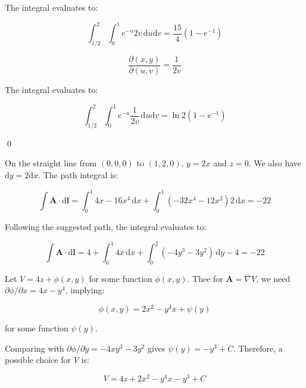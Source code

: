 \documentclass[12pt]{article}
\begin{document}
The integral evaluates to:

\begin{equation}
    \int_{1/2}^{2} \int_{0}^{1} e^{-u} 2v \, \mathrm{d}u \mathrm{d}v = \frac{15}{4} (1 - e^{-1})
\end{equation}

\begin{correction}
    \begin{equation}
        \frac{\partial (x, y)}{\partial (u, v)} = \frac{1}{2v}
    \end{equation}

    The integral evaluates to:

    \begin{equation}
        \int_{1/2}^{2} \int_{0}^{1} e^{-u} \frac{1}{2v} \, \mathrm{d}u \mathrm{d}v = \ln{2} (1 - e^{-1})
    \end{equation}
\end{correction}
\qed



On the straight line from $(0, 0, 0)$ to $(1, 2, 0)$, $y = 2x$ and $z = 0$. We also have $\mathrm{d}y = 2\mathrm{d}x$. The path integral is:

\begin{equation}
    \int \mathbf{A} \cdot \mathrm{d}\mathbf{l} = \int_{0}^{1} 4x - 16x^{4} \, \mathrm{d}x + \int_{0}^{1} (-32x^{4} - 12x^{2}) 2 \, \mathrm{d}x = -22
\end{equation}

Following the suggested path, the integral evaluates to:

\begin{equation}
    \int \mathbf{A} \cdot \mathrm{d}\mathbf{l} = 4 + \int_{0}^{1} 4x \, \mathrm{d}x + \int_{0}^{2} (-4y^{3} - 3y^{2}) \, \mathrm{d}y - 4 = -22
\end{equation}

Let $V = 4z + \phi(x, y)$ for some function $\phi(x, y)$. Thee for $\mathbf{A} = \nabla V$, we need $\partial \phi/\partial x = 4x - y^{4}$, implying:

\begin{equation}
    \phi(x, y) = 2x^{2} - y^{4}x + \psi(y)
\end{equation}

for some function $\psi(y)$.

Comparing with $\partial \phi/\partial y = -4xy^{3} - 3y^{2}$ gives $\psi(y) = -y^{3} + C$. Therefore, a possible choice for $V$ is:

\begin{equation}
    V = 4z + 2x^{2} - y^{4}x - y^{3} + C
\end{equation}
\end{document}
